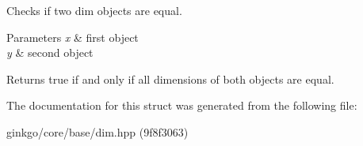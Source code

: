 Checks if two dim objects are equal. 


\begin{DoxyParams}{Parameters}
{\em x} & first object \\
\hline
{\em y} & second object\\
\hline
\end{DoxyParams}
\begin{DoxyReturn}{Returns}
true if and only if all dimensions of both objects are equal. 
\end{DoxyReturn}


The documentation for this struct was generated from the following file\+:\begin{DoxyCompactItemize}
\item 
ginkgo/core/base/dim.\+hpp (9f8f3063)\end{DoxyCompactItemize}
